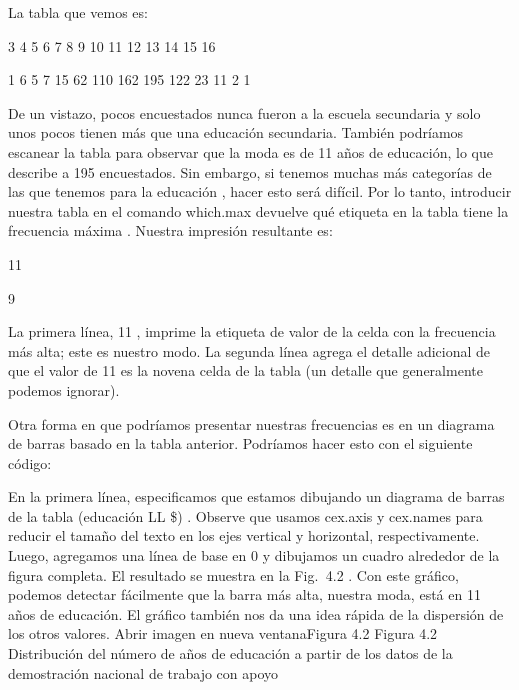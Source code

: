 \documentclass[
]{book}
\newenvironment{Shaded}{\begin{snugshade}}{\end{snugshade}}
\newcommand{\AttributeTok}[1]{\textcolor[rgb]{0.77,0.63,0.00}{#1}}
\newcommand{\DecValTok}[1]{\textcolor[rgb]{0.00,0.00,0.81}{#1}}
\newcommand{\FunctionTok}[1]{\textcolor[rgb]{0.00,0.00,0.00}{#1}}
\newcommand{\NormalTok}[1]{#1}
\newcommand{\SpecialCharTok}[1]{\textcolor[rgb]{0.00,0.00,0.00}{#1}}
\newcommand{\StringTok}[1]{\textcolor[rgb]{0.31,0.60,0.02}{#1}}
\begin{document}
La tabla que vemos es:

3 4 5 6 7 8 9 10 11 12 13 14 15 16

1 6 5 7 15 62 110 162 195 122 23 11 2 1

De un vistazo, pocos encuestados nunca fueron a la escuela secundaria y solo unos pocos tienen más que una educación secundaria. También podríamos escanear la tabla para observar que la moda es de 11 años de educación, lo que describe a 195 encuestados. Sin embargo, si tenemos muchas más categorías de las que tenemos para la educación , hacer esto será difícil. Por lo tanto, introducir nuestra tabla en el comando which.max devuelve qué etiqueta en la tabla tiene la frecuencia máxima . Nuestra impresión resultante es:

11

9

La primera línea, 11 , imprime la etiqueta de valor de la celda con la frecuencia más alta; este es nuestro modo. La segunda línea agrega el detalle adicional de que el valor de 11 es la novena celda de la tabla (un detalle que generalmente podemos ignorar).

Otra forma en que podríamos presentar nuestras frecuencias es en un diagrama de barras basado en la tabla anterior. Podríamos hacer esto con el siguiente código:

\begin{Shaded}
\end{Shaded}

En la primera línea, especificamos que estamos dibujando un diagrama de barras de la tabla (educación LL \$) . Observe que usamos cex.axis y cex.names para reducir el tamaño del texto en los ejes vertical y horizontal, respectivamente. Luego, agregamos una línea de base en 0 y dibujamos un cuadro alrededor de la figura completa. El resultado se muestra en la Fig.  4.2 . Con este gráfico, podemos detectar fácilmente que la barra más alta, nuestra moda, está en 11 años de educación. El gráfico también nos da una idea rápida de la dispersión de los otros valores.
Abrir imagen en nueva ventanaFigura 4.2
Figura 4.2
Distribución del número de años de educación a partir de los datos de la demostración nacional de trabajo con apoyo
\end{document}
